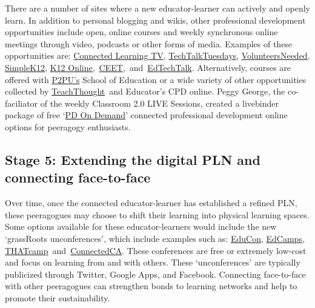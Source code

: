 There are a number of sites where a new educator-learner can actively
and openly learn. In addition to personal blogging and wikis, other
professional development opportunities include open, online courses and
weekly synchronous online meetings through video, podcasts or other
forms of media. Examples of these opportunities are:
\href{http://connectedlearning.tv/howard-rheingold-social-media-and-peer-learning-mediated-pedagogy-peeragogy}{Connected
Learning TV},
\href{http://techtalktuesdays.global2.vic.edu.au/}{TechTalkTuesdays},
\href{http://learning2gether.pbworks.com/w/page/32206114/volunteersneeded}{VolunteersNeeded},
\href{http://simplek12.com/webinars}{SimpleK12},
\href{http://k12onlineconference.org/}{K12
Online,}~\href{http://www.learnnowbc.ca/educators/moodlemeets/default.aspx}{CEET},~and~\href{http://edtechtalk.com/taxonomy/term/130}{EdTechTalk}.
Alternatively, courses are offered with
\href{https://p2pu.org/en/schools/school-of-ed-pilot/}{P2PU's} School of
Education or a wide variety of other opportunities collected by
\href{http://www.teachthought.com/}{TeachThought}~and Educator's CPD
online. Peggy George, the co-faciliator of the weekly Classroom 2.0 LIVE
Sessions, created a livebinder package of free
`\href{http://www.google.com/url?q=http\%3A\%2F\%2Fwww.livebinders.com\%2Fplay\%2Fplay\_or\_edit\%3Fid\%3D429095\&sa=D\&sntz=1\&usg=AFQjCNHCIdRn64rPwske2vP7xrpWolb-jA}{PD
On Demand}' connected professional development online options for
peeragogy enthusiasts.

\subsection{Stage 5: Extending the digital PLN and connecting
face-to-face}

Over time, once the connected educator-learner has established a refined
PLN, these peeragogues may choose to shift their learning into physical
learning spaces. Some options available for these educator-learners
would include the new `grassRoots unconferences', which include examples
such as: \href{http://educonphilly.org/}{EduCon},
\href{http://davidwees.com/content/what-edcamp}{EdCamps},
\href{http://thatcamp.org/}{THATcamp}~and~\href{http://connectedcanada.org/}{ConnectedCA}.
These conferences are free or extremely low-cost and focus on learning
from and with others. These `unconferences' are typically publicized
through Twitter, Google Apps, and Facebook. Connecting face-to-face with
other peeragogues can strengthen bonds to learning networks and help to
promote their sustainability.

